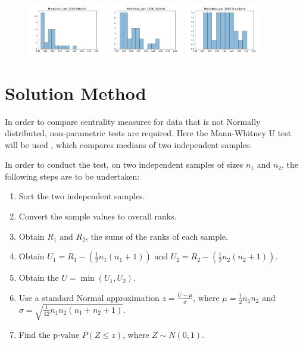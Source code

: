 \documentclass{article}
\begin{document}
\begin{figure}[h]
\centering
\includegraphics[width=0.3\textwidth]{south_homeless.pdf}
\includegraphics[width=0.3\textwidth]{north_homeless.pdf}
\includegraphics[width=0.3\textwidth]{london_homeless.pdf}
\end{figure}

\section{Solution Method}
In order to compare centrality measures for data that is not Normally
distributed, non-parametric tests are required.
Here the Mann-Whitney U test will be used \cite{mannwhitneyu}, which compares
medians of two independent samples.

In order to conduct the test, on two independent samples of sizes $n_1$ and
$n_2$, the following steps are to be undertaken:

\begin{enumerate}
  \setlength\itemsep{0em}
  \item Sort the two independent samples.
  \item Convert the sample values to overall ranks.
  \item Obtain $R_1$ and $R_2$, the sums of the ranks of each sample.
  \item Obtain $U_1 = R_1 - \left(\frac{1}{2} n_1 (n_1 + 1)\right)$ and $U_2 = R_2 - \left(\frac{1}{2} n_2 (n_2 + 1)\right)$.
  \item Obtain the $U = \min(U_1, U_2)$.
  \item Use a standard Normal approximation $z = \frac{U - \mu}{\sigma}$, where $\mu = \frac{1}{2} n_1 n_2$ and $\sigma = \sqrt{\frac{1}{12} n_1 n_2 (n_1 + n_2 + 1)}$.
  \item Find the p-value $P(Z \leq z)$, where $Z \sim N(0, 1)$.
\end{enumerate}
\end{document}
